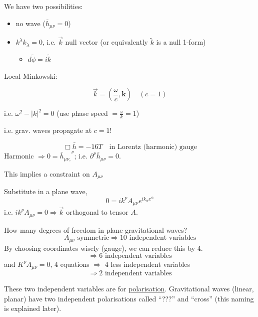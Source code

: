 \documentclass[a4paper]{article} %
\newcommand{\vect}[1]{\mathbf{#1}} %
\newcommand{\ph}[1]{\phantom{#1}}
\renewcommand{\tilde}{\widetilde}
\begin{document}
We have two possibilities:
\begin{itemize}
\item no wave ($\bar{h}_{\mu\nu}=0$)
\item $k^{\lambda}k_{\lambda}=0$, i.e. $\vec{k}$ null vector (or equivalently $\tilde{k}$ is a null 1-form)
\begin{itemize}
\item[] $d\tilde{\phi}=i\tilde{k}$
\end{itemize}
\end{itemize}

Local Minkowski:

\begin{equation}
\vec{k}=\left(\frac{\omega}{c},\vect{k}\right)\quad(c=1)
\end{equation}

i.e. $\omega^2 - |k|^2=0$ (use phase speed $=\frac{\omega}{k}=1$)

i.e. grav. waves propagate at $c=1$!

\begin{equation}
\Box \bar{h}=-16T\quad\text{in Lorentz (harmonic) gauge}
\end{equation}
Harmonic $\Rightarrow 0 =\bar{h}_{\mu\nu,}^{\ph{\mu\nu,}\nu}$; i.e. 
$\partial^{\nu}\bar{h}_{\mu\nu}=0$.

This implies a constraint on $A_{\mu\nu}$

Substitute in a plane wave,
\begin{equation}
0=ik^{\nu}A_{\mu\nu}e^{ik_{\alpha}x^{\alpha}}
\end{equation}
i.e. $ik^{\nu}A_{\mu\nu}=0 \Rightarrow \vec{k}$ orthogonal to tensor $A$.

How many degrees of freedom in plane gravitational waves?
\begin{equation}
A_{\mu\nu}\text{ symmetric}\Rightarrow 10\text{ independent variables}
\end{equation}
By choosing coordinates wisely (gauge), we can reduce this by 4.
\begin{equation}
\Rightarrow 6\text{ independent variables}
\end{equation}
and $K^{\nu}A_{\mu\nu}=0$, 4 equations $\Rightarrow$ 4 less independent variables
\begin{equation}
\Rightarrow 2\text{ independent variables}
\end{equation}

These two independent variables are for \underline{polarisation}. Gravitational waves (linear, planar) have two independent polarisations called ``???'' and ``cross'' (this naming is explained later).
\end{document}
